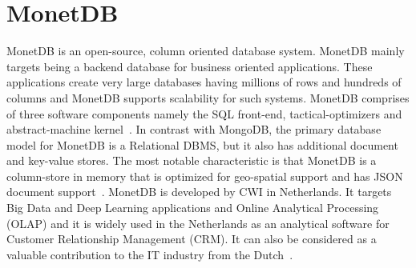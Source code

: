 \section{MonetDB}

MonetDB is an open-source, column oriented database system. MonetDB
mainly targets being a backend database for business oriented
applications. These applications create very large databases having
millions of rows and hundreds of columns and MonetDB supports
scalability for such systems. MonetDB comprises of three software
components namely the SQL front-end, tactical-optimizers and
abstract-machine kernel~\cite{hid-sp18-416-www-monetdb-features}. In
contrast with MongoDB, the primary database model for MonetDB is a
Relational DBMS, but it also has additional document and key-value
stores. The most notable characteristic is that MonetDB is a
column-store in memory that is optimized for geo-spatial support and
has JSON document
support~\cite{hid-sp18-416-www-monetdb-mongodb-comparison}. MonetDB is
developed by CWI in Netherlands. It targets Big Data and Deep Learning
applications and Online Analytical Processing (OLAP) and it is widely
used in the Netherlands as an analytical software for Customer
Relationship Management (CRM). It can also be considered as a valuable
contribution to the IT industry from the
Dutch~\cite{hid-sp18-416-www-monetdb-dutch}.
